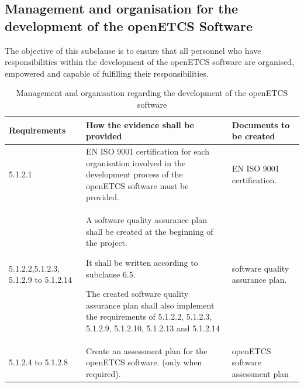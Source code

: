 \documentclass{template/openetcs_report}
\begin{document}
\subsection{Management and organisation for the development of the openETCS Software}
\begin{flushleft}
The objective of this subclause is to ensure that all personnel who have responsibilities within the development of the openETCS software are organised, empowered and capable of fulfilling their responsibilities.
\end{flushleft}
{\footnotesize\sffamily\centering
\begin{longtable}{|p{2cm}|p{9cm}|p{3cm}|}
\caption{Management and organisation regarding the development of the openETCS software}\\
\hline
\bfseries Requirements & \bfseries How the evidence shall be provided & \bfseries Documents to be created\\
\hline
\hline
\endhead
\hline
\endfoot

5.1.2.1 & EN ISO 9001 certification for each organisation involved in the development process of the openETCS software must be provided. & EN ISO 9001 certification.\\ 
\hline
5.1.2.2,5.1.2.3, 5.1.2.9 to 5.1.2.14 & A software quality assurance plan shall be created at the beginning of the project. 

It shall be written according to subclause 6.5.

The created software quality assurance plan shall also implement the requirements of 5.1.2.2, 5.1.2.3, 5.1.2.9, 5.1.2.10, 5.1.2.13 and 5.1.2.14
& software quality assurance plan.\\ 
\hline
5.1.2.4 to 5.1.2.8 & Create an assessment plan for the openETCS software. (only when required).
& openETCS software assessment plan\\ 
\hline
\end{longtable}}
\end{document}
